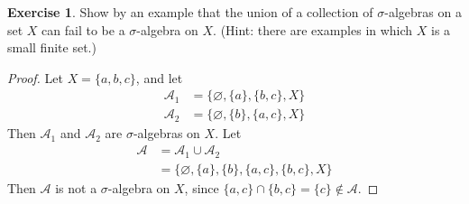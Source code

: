 \documentclass[11pt,a4paper,twoside]{article}
\theoremstyle{definition}
\newcounter{excounter}
\newtheorem{exercise}[excounter]{Exercise}
\begin{document}
\begin{exercise}

  Show by an example that the union of a collection of $\sigma$-algebras on a set $X$
  can fail to be a $\sigma$-algebra on $X$. (Hint: there are examples in which $X$ is
  a small finite set.)

\end{exercise}

\begin{proof}

  Let $X = \{ a, b, c \}$, and let
  \begin{align*}
    \mathscr{A}_1 &= \big\{ \varnothing, \{ a \}, \{ b, c \}, X \big\} \\
    \mathscr{A}_2 &= \big\{ \varnothing, \{ b \}, \{ a, c \}, X \big\}
  \end{align*}
  Then $\mathscr{A}_1$ and $\mathscr{A}_2$ are $\sigma$-algebras on $X$. Let
  \begin{align*}
    \mathscr{A} &= \mathscr{A}_1 \cup \mathscr{A}_2 \\
    &= \big\{ \varnothing, \{ a \}, \{ b \}, \{ a, c \}, \{ b, c \}, X \big\}
  \end{align*}
  Then $\mathscr{A}$ is not a $\sigma$-algebra on $X$, since $\{ a, c \} \cap \{ b, c \} = \{ c \} \notin \mathscr{A}$.

\end{proof}
\end{document}
